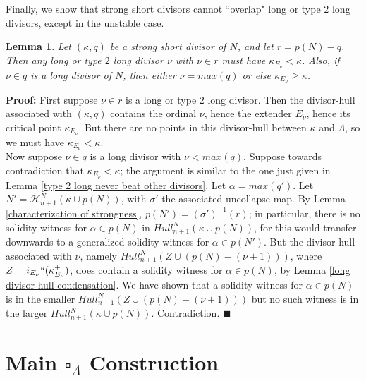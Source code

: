 \documentclass[12pt]{article}
\newtheorem{lem}[thm]{Lemma}
\begin{document}
Finally, we show that strong short divisors cannot ``overlap" long or type $2$ long divisors, except in the unstable case.\\

\begin{lem} \label{no long-short overlaps except unstable}
Let $(\kappa , q)$ be a strong short divisor of $N$, and let $r = p(N) - q$.  Then any long or type $2$ long divisor $\nu$ with $\nu \in r$ must have $\kappa_{E_\nu} < \kappa$.  Also, if $\nu \in q$ is a long divisor of $N$, then either $\nu = max(q)$ or else $\kappa_{E_\nu} \geq \kappa$.
\end{lem}

\textbf{Proof:}  First suppose $\nu \in r$ is a long or type $2$ long divisor.  Then the divisor-hull associated with $(\kappa , q)$ contains the ordinal $\nu$, hence the extender $E_\nu$, hence its critical point $\kappa_{E_\nu}$.  But there are no points in this divisor-hull between $\kappa$ and $\Lambda$, so we must have $\kappa_{E_\nu} < \kappa$.\\

Now suppose $\nu \in q$ is a long divisor with $\nu < max (q)$.  Suppose towards contradiction that $\kappa_{E_\nu} < \kappa$; the argument is similar to the one just given in Lemma \ref{type 2 long never beat other divisors}.  Let $\alpha = max(q')$.  Let $N' = \mathcal{H}_{n+1}^N ( \kappa \cup p(N))$, with $\sigma'$ the associated uncollapse map.  By Lemma \ref{characterization of strongness}, $p (N') = (\sigma')^{-1} (r)$; in particular, there is no solidity witness for $\alpha \in p(N)$ in $Hull_{n+1}^N ( \kappa \cup p(N))$, for this would transfer downwards to a generalized solidity witness for $\alpha \in p(N')$.  But the divisor-hull associated with $\nu$, namely $Hull^N_{n+1} (Z \cup (p(N) - (\nu + 1)))$, where $Z = i_{E_\nu}``(\kappa_{E_\nu}^+)$, does contain a solidity witness for $\alpha \in p(N)$, by Lemma \ref{long divisor hull condensation}.  We have shown that a solidity witness for $\alpha \in p(N)$ is in the smaller $Hull^N_{n+1} (Z \cup (p(N) - (\nu + 1)))$ but no such witness is in the larger $Hull_{n+1}^N ( \kappa \cup p(N))$.  Contradiction.  $\blacksquare$\\






\section{Main $\square_\Lambda$ Construction} \label{main construction section}
\end{document}
